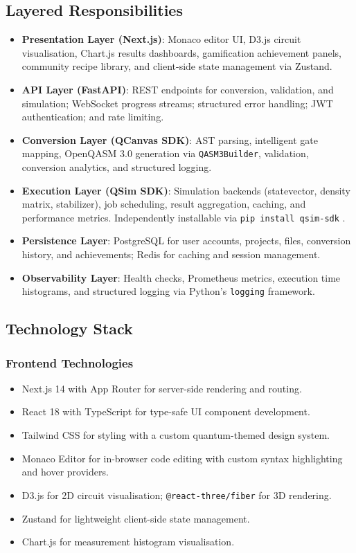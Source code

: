 \subsection{Layered Responsibilities}
\begin{itemize}
    \item \textbf{Presentation Layer (Next.js)}: Monaco editor UI, D3.js circuit visualisation, Chart.js results dashboards, gamification achievement panels, community recipe library, and client-side state management via Zustand.
    \item \textbf{API Layer (FastAPI)}: REST endpoints for conversion, validation, and simulation; WebSocket progress streams; structured error handling; JWT authentication; and rate limiting.
    \item \textbf{Conversion Layer (QCanvas SDK)}: AST parsing, intelligent gate mapping, OpenQASM 3.0 generation via \texttt{QASM3Builder}, validation, conversion analytics, and structured logging.
    \item \textbf{Execution Layer (QSim SDK)}: Simulation backends (statevector, density matrix, stabilizer), job scheduling, result aggregation, caching, and performance metrics. Independently installable via \texttt{pip install qsim-sdk} \cite{qsim_sdk_2026}.
    \item \textbf{Persistence Layer}: PostgreSQL for user accounts, projects, files, conversion history, and achievements; Redis for caching and session management.
    \item \textbf{Observability Layer}: Health checks, Prometheus metrics, execution time histograms, and structured logging via Python's \texttt{logging} framework.
\end{itemize}

\subsection{Technology Stack}

\subsubsection{Frontend Technologies}
\begin{itemize}
    \item Next.js 14 with App Router for server-side rendering and routing.
    \item React 18 with TypeScript for type-safe UI component development.
    \item Tailwind CSS for styling with a custom quantum-themed design system.
    \item Monaco Editor for in-browser code editing with custom syntax highlighting and hover providers.
    \item D3.js for 2D circuit visualisation; \texttt{@react-three/fiber} for 3D rendering.
    \item Zustand for lightweight client-side state management.
    \item Chart.js for measurement histogram visualisation.
\end{itemize}

